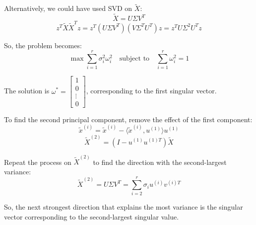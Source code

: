 \begin{intuition}
Alternatively, we could have used SVD on \( \tilde{X} \):
\[
\tilde{X} = U \Sigma V^T
\]
\[
z^T \tilde{X} \tilde{X}^T z = z^T \left( U \Sigma V^T \right) \left( V \Sigma^T U^T \right) z = z^T U \Sigma^2 U^T z
\]

So, the problem becomes:
\[
\max \sum_{i=1}^{r} \sigma_i^2 \omega_i^2 \quad \text{subject to} \quad \sum_{i=1}^{r} \omega_i^2 = 1
\]

The solution is \( \omega^* = \begin{bmatrix} 1 \\ 0 \\ \vdots \\ 0 \end{bmatrix} \), corresponding to the first singular vector.

To find the second principal component, remove the effect of the first component:
\[
\tilde{x}^{(i)} = \tilde{x}^{(i)} - \langle \tilde{x}^{(i)}, u^{(1)} \rangle u^{(1)}
\]
\[
\tilde{X}^{(2)} = \left( I - u^{(1)} u^{(1)T} \right) \tilde{X}
\]

Repeat the process on \( \tilde{X}^{(2)} \) to find the direction with the second-largest variance:
\[
\tilde{X}^{(2)} = U \Sigma V^T = \sum_{i=2}^{r} \sigma_i u^{(i)} v^{(i)T}
\]

So, the next strongest direction that explains the most variance is the singular vector corresponding to the second-largest singular value.
\end{intuition}